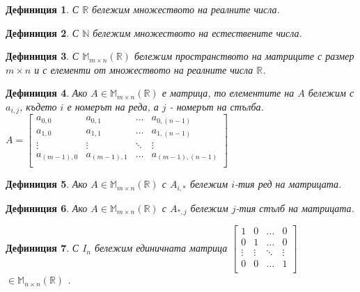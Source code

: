 \documentclass[a4paper,12pt]{article}
\newtheorem{defn}{Дефиниция}[section]
\begin{document}
\begin{defn}
С $\mathbb{R}$ бележим множеството на реалните числа.
\end{defn}

\begin{defn}
С $\mathbb{N}$ бележим множеството на естествените числа.
\end{defn}

\begin{defn}
С $\mathbb{M}_{m \times n} (\mathbb{R})$ бележим пространството на матриците с размер ${m \times n}$ и с елементи от множеството на реалните числа $\mathbb{R}$.
\end{defn}

\begin{defn}
Ако $A \in \mathbb{M}_{m \times n} (\mathbb{R})$ е матрица, то елементите на $A$ бележим с $a_{i,j}$, където $i$ е номерът на реда, а $j$ - номерът на стълба. \\
$A = \begin{bmatrix}
  a_{0,0}     & a_{0,1}     & \dots  & a_{0,(n-1)} \\ 
  a_{1,0}     & a_{1,1}     & \dots  & a_{1,(n-1)} \\ 
  \vdots      & \vdots      & \ddots & \vdots \\
  a_{(m-1),0} & a_{(m-1),1} & \dots  & a_{(m-1),(n-1)} \\ 
\end{bmatrix}$
\end{defn}

\begin{defn}
Ако $A \in \mathbb{M}_{m \times n} (\mathbb{R})$ с $A_{i, *}$ бележим $i$-тия ред на матрицата.
\end{defn}

\begin{defn}
Ако $A \in \mathbb{M}_{m \times n} (\mathbb{R})$ с $A_{*, j}$ бележим $j$-тия стълб на матрицата.
\end{defn}

\begin{defn}
С $I_n$ бележим единичната матрица $\begin{bmatrix}
  1      & 0      & \dots  & 0 \\ 
  0      & 1      & \dots  & 0 \\ 
  \vdots & \vdots & \ddots & \vdots \\
  0      & 0      & \dots  & 1 \\ 
\end{bmatrix}$ $\in \mathbb{M}_{n \times n} (\mathbb{R})$ .
\end{defn}
\end{document}
